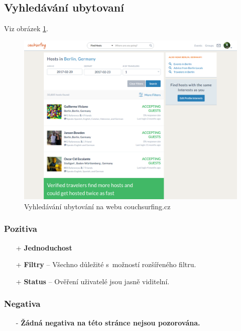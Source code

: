 
\newpage
\subsection{Vyhledávání ubytovaní}
Viz obrázek \ref{fig:couchsurfing:search}.
\begin{figure}[h]
    \centering
    \includegraphics[width=1.0\textwidth]{media/couchsurfing/search.png}
    \caption{Vyhledávání ubytování na webu couchsurfing.cz}
    \label{fig:couchsurfing:search}
\end{figure}
\subsubsection*{Pozitiva}
\begin{itemize}
    \item[+] \textbf{Jednoduchost}
    \item[+] \textbf{Filtry} -- Všechno důležité s~možností rozšířeného filtru.
    \item[+] \textbf{Status} -- Ověření uživatelé jsou jasně viditelní.
\end{itemize}
\subsubsection*{Negativa}
\begin{itemize}
    \item[-] \textbf{Žádná negativa na této stránce nejsou pozorována.}
\end{itemize}


